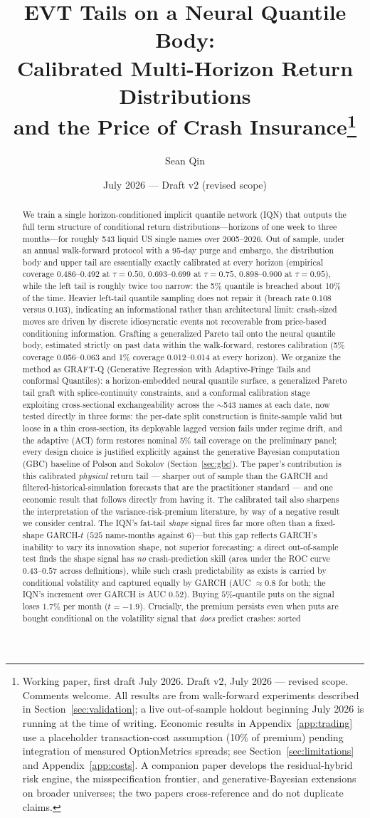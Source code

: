 \documentclass[11pt]{article}
\title{EVT Tails on a Neural Quantile Body:\\
Calibrated Multi-Horizon Return Distributions\\
and the Price of Crash Insurance\thanks{Working paper, first draft July 2026. Draft v2, July 2026 --- revised scope. Comments welcome. All results are from walk-forward experiments described in Section~\ref{sec:validation}; a live out-of-sample holdout beginning July 2026 is running at the time of writing. Economic results in Appendix~\ref{app:trading} use a placeholder transaction-cost assumption (10\% of premium) pending integration of measured OptionMetrics spreads; see Section~\ref{sec:limitations} and Appendix~\ref{app:costs}. A companion paper develops the residual-hybrid risk engine, the misspecification frontier, and generative-Bayesian extensions on broader universes; the two papers cross-reference and do not duplicate claims.}}
\author{Sean Qin}
\date{July 2026 --- Draft v2 (revised scope)}
\begin{document}
\maketitle

\begin{abstract}
\noindent We train a single horizon-conditioned implicit quantile network (IQN) that outputs the full term structure of conditional return distributions---horizons of one week to three months---for roughly 543 liquid US single names over 2005--2026. Out of sample, under an annual walk-forward protocol with a 95-day purge and embargo, the distribution body and upper tail are essentially exactly calibrated at every horizon (empirical coverage 0.486--0.492 at $\tau=0.50$, 0.693--0.699 at $\tau=0.75$, 0.898--0.900 at $\tau=0.95$), while the left tail is roughly twice too narrow: the 5\% quantile is breached about 10\% of the time. Heavier left-tail quantile sampling does not repair it (breach rate 0.108 versus 0.103), indicating an informational rather than architectural limit: crash-sized moves are driven by discrete idiosyncratic events not recoverable from price-based conditioning information. Grafting a generalized Pareto tail onto the neural quantile body, estimated strictly on past data within the walk-forward, restores calibration (5\% coverage 0.056--0.063 and 1\% coverage 0.012--0.014 at every horizon). We organize the method as GRAFT-Q (Generative Regression with Adaptive-Fringe Tails and conformal Quantiles): a horizon-embedded neural quantile surface, a generalized Pareto tail graft with splice-continuity constraints, and a conformal calibration stage exploiting cross-sectional exchangeability across the $\sim$543 names at each date, now tested directly in three forms: the per-date split construction is finite-sample valid but loose in a thin cross-section, its deployable lagged version fails under regime drift, and the adaptive (ACI) form restores nominal $5\%$ tail coverage on the preliminary panel; every design choice is justified explicitly against the generative Bayesian computation (GBC) baseline of Polson and Sokolov (Section~\ref{sec:gbc}). The paper's contribution is this calibrated \emph{physical} return tail --- sharper out of sample than the GARCH and filtered-historical-simulation forecasts that are the practitioner standard --- and one economic result that follows directly from having it. The calibrated tail also sharpens the interpretation of the variance-risk-premium literature, by way of a negative result we consider central. The IQN's fat-tail \emph{shape} signal fires far more often than a fixed-shape GARCH-$t$ ($525$ name-months against $6$)---but this gap reflects GARCH's inability to vary its innovation shape, not superior forecasting: a direct out-of-sample test finds the shape signal has \emph{no} crash-prediction skill (area under the ROC curve $0.43$--$0.57$ across definitions), while such crash predictability as exists is carried by conditional volatility and captured equally by GARCH (AUC $\approx 0.8$ for both; the IQN's increment over GARCH is AUC $0.52$). Buying $5\%$-quantile puts on the signal loses $1.7\%$ per month ($t=-1.9$). Crucially, the premium persists even when puts are bought conditional on the volatility signal that \emph{does} predict crashes: sorted 
\end{abstract}
\end{document}
